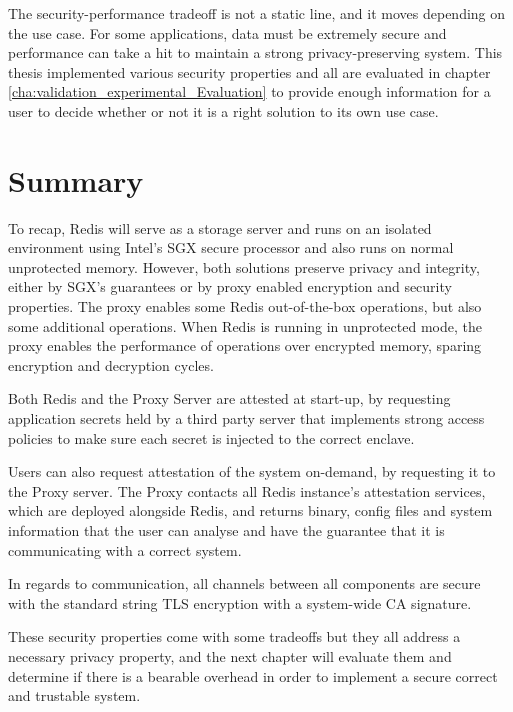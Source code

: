 The security-performance tradeoff is not a static line, and it moves depending on the use case. For some applications, data must be extremely secure and performance can take a hit to maintain a strong privacy-preserving system. This thesis implemented various security properties and all are evaluated in chapter \ref{cha:validation_experimental_Evaluation} to provide enough information for a user to decide whether or not it is a right solution to its own use case.

\section{Summary}
\label{sec:chapter4_summary}

To recap, Redis will serve as a storage server and runs on an isolated environment using Intel's \gls{SGX} secure processor and also runs on normal unprotected memory. However, both solutions preserve privacy and integrity, either by \gls{SGX}'s guarantees or by proxy enabled encryption and security properties. The proxy enables some Redis out-of-the-box operations, but also some additional operations. When Redis is running in unprotected mode, the proxy enables the performance of operations over encrypted memory, sparing encryption and decryption cycles.

Both Redis and the Proxy Server are attested at start-up, by requesting application secrets held by a third party server that implements strong access policies to make sure each secret is injected to the correct enclave. 

Users can also request attestation of the system on-demand, by requesting it to the Proxy server. The Proxy contacts all Redis instance's attestation services, which are deployed alongside Redis, and returns binary, config files and system information that the user can analyse and have the guarantee that it is communicating with a correct system.

In regards to communication, all channels between all components are secure with the standard string TLS encryption with a system-wide CA signature.

These security properties come with some tradeoffs but they all address a necessary privacy property, and the next chapter will evaluate them and determine if there is a bearable overhead in order to implement a secure correct and trustable system.